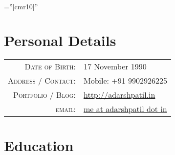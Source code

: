 \documentclass[a4paper,10pt]{article} %
\begin{document}
\pagestyle{empty} %

\font\fb=''[cmr10]'' %


\par{\bigskip\par} %

\section{Personal Details}

\begin{tabular}{rl}
\textsc{Date of Birth:} & 17 November 1990 \\
\textsc{Address / Contact:} & Mobile: +91 9902926225 \\
\textsc{Portfolio / Blog:} & \href{http://adarshpatil.in/timewarp}{http://adarshpatil.in}\\
\textsc{email:} & \href{mailto:me@adarshpatil.in}{me at adarshpatil dot in}
\end{tabular}


\section{Education}
\end{document}
